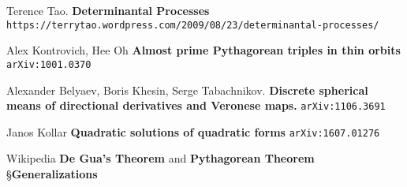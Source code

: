 \documentclass[12pt]{article}
\begin{document}
\selectfont \fontsize{12}{10}\selectfont

\begin{thebibliography}{}


\item Terence Tao.  \textbf{Determinantal Processes} \\ \texttt{https://terrytao.wordpress.com/2009/08/23/determinantal-processes/}

\item Alex Kontrovich, Hee Oh \textbf{
Almost prime Pythagorean triples in thin orbits}
\texttt{arXiv:1001.0370}


\item Alexander Belyaev, Boris Khesin, Serge Tabachnikov. \textbf{Discrete spherical means of directional derivatives and Veronese maps.}
\texttt{arXiv:1106.3691}

\item Janos Kollar \textbf{Quadratic solutions of quadratic forms} \texttt{arXiv:1607.01276}

\item Wikipedia \textbf{De Gua's Theorem} and  \textbf{Pythagorean Theorem} \S \textbf{Generalizations}

\end{thebibliography}
\end{document}
